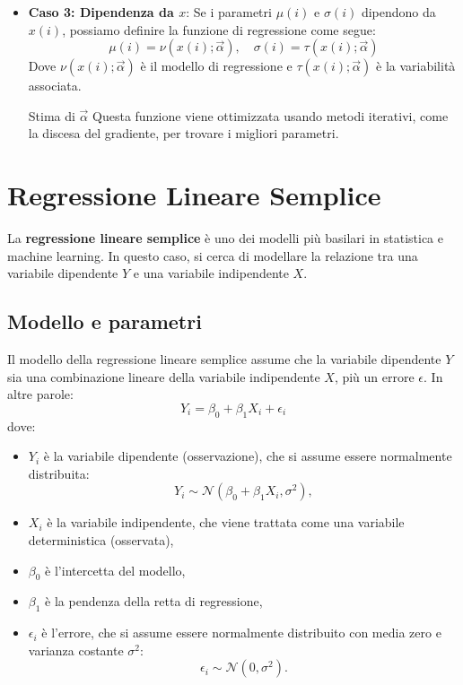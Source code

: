 \begin{itemize}
    \item \textbf{Caso 3: Dipendenza da \( x \)}: Se i parametri \( \mu(i) \) e \( \sigma(i) \) dipendono da \( x(i) \), possiamo definire la funzione di regressione come segue:
        \[
            \mu(i) = \nu(x(i); \vec{\alpha}), \quad \sigma(i) = \tau(x(i); \vec{\alpha})
        \]
        Dove \( \nu(x(i); \vec{\alpha}) \) è il modello di regressione e \( \tau(x(i); \vec{\alpha}) \) è la variabilità associata.

        \begin{nota}{Stima di $\vec{\alpha}$}{}
            Questa funzione viene ottimizzata usando metodi iterativi, come la discesa
            del gradiente, per trovare i migliori parametri.
        \end{nota}
\end{itemize}

\section{Regressione Lineare Semplice}\label{sec:regressione}

La \textbf{regressione lineare semplice} è uno dei modelli più basilari in statistica e machine learning. In questo caso, si cerca di modellare la relazione tra una variabile dipendente \( Y \) e una variabile indipendente \( X \).

\subsection{Modello e parametri}

Il modello della regressione lineare semplice assume che la variabile dipendente \( Y \) sia una combinazione lineare della variabile indipendente \( X \), più un errore \( \epsilon \). In altre parole:
\[
Y_i = \beta_0 + \beta_1 X_i + \epsilon_i
\]
dove:
\begin{itemize}
\item \( Y_i \) è la variabile dipendente (osservazione), che si assume essere normalmente distribuita: 
    \[ Y_i \sim \mathcal{N}(\beta_0 + \beta_1 X_i, \sigma^2), \]
\item \( X_i \) è la variabile indipendente, che viene trattata come una variabile deterministica (osservata),
\item \( \beta_0 \) è l'intercetta del modello,
\item \( \beta_1 \) è la pendenza della retta di regressione,
\item \( \epsilon_i \) è l'errore, che si assume essere normalmente distribuito con media zero e varianza costante \( \sigma^2 \):
        \[ \epsilon_i \sim \mathcal{N}(0, \sigma^2). \]
\end{itemize}

